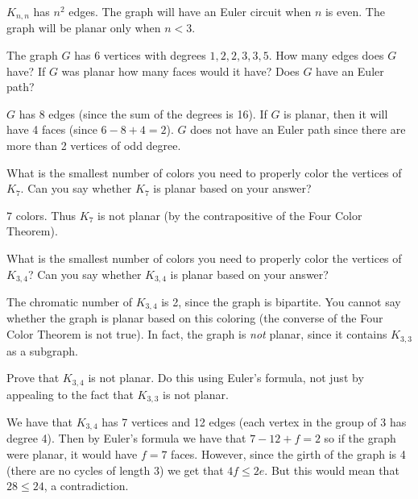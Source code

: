 \begin{questions}
  \begin{answer}
  $K_{n,n}$ has $n^2$ edges.  The graph will have an Euler circuit when $n$ is even.  The graph will be planar only when $n < 3$.
  \end{answer}



 \question The graph $G$ has 6 vertices with degrees $1, 2, 2, 3, 3, 5$.  How many edges does $G$ have?  If $G$ was planar how many faces would it have?  Does $G$ have an Euler path?

  \begin{answer}
  $G$ has 8 edges (since the sum of the degrees is 16).  If $G$ is planar, then it will have 4 faces (since $6 - 8 + 4 = 2$).  $G$ does not have an Euler path since there are more than 2 vertices of odd degree.
  \end{answer}



\question What is the smallest number of colors you need to properly color the vertices of $K_{7}$.  Can you say whether $K_7$ is planar based on your answer?

  \begin{answer}
  $7$ colors.  Thus $K_7$ is not planar (by the contrapositive of the Four Color Theorem).
  \end{answer}


\question What is the smallest number of colors you need to properly color the vertices of $K_{3,4}$?  Can you say whether $K_{3,4}$ is planar based on your answer?

  \begin{answer}
  The chromatic number of $K_{3,4}$ is 2, since the graph is bipartite.  You cannot say whether the graph is planar based on this coloring (the converse of the Four Color Theorem is not true).  In fact, the graph is {\em not} planar, since it contains $K_{3,3}$ as a subgraph.
  \end{answer}


\question Prove that $K_{3,4}$ is not planar.  Do this using Euler's formula, not just by appealing to the fact that $K_{3,3}$ is not planar.

	\begin{answer}
		We have that $K_{3,4}$ has 7 vertices and 12 edges (each vertex in the group of 3 has degree 4).  Then by Euler's formula we have that $7 - 12 + f = 2$ so if the graph were planar, it would have $f = 7$ faces.  However, since the girth of the graph is 4 (there are no cycles of length 3) we get that $4f \le 2e$.  But this would mean that $28 \le 24$, a contradiction.
	\end{answer}





\end{questions}
